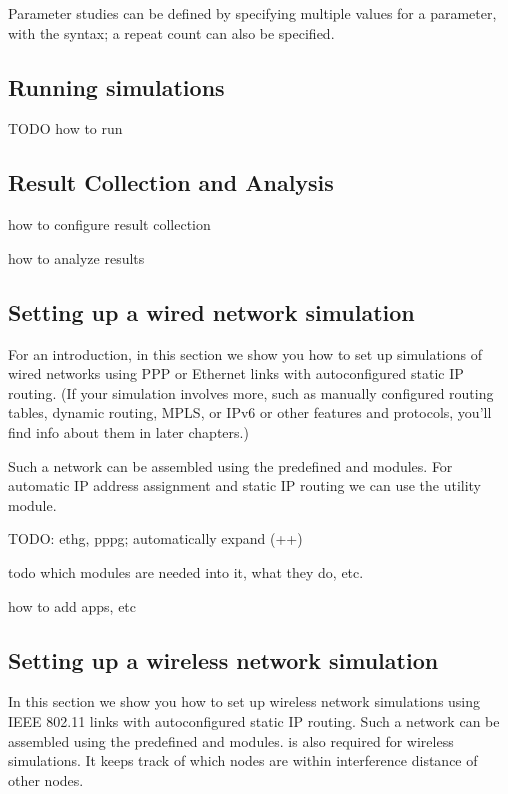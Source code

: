 Parameter studies can be defined by specifying multiple values for a
parameter, with the  syntax;
a repeat count can also be specified.


\subsection{Running simulations}

TODO how to run

\subsection{Result Collection and Analysis}

how to configure result collection

how to analyze results



\subsection{Setting up a wired network simulation}

For an introduction, in this section we show you how to set up simulations
of wired networks using PPP or Ethernet links with autoconfigured static IP
routing. (If your simulation involves more, such as manually configured
routing tables, dynamic routing, MPLS, or IPv6 or other features and protocols,
you'll find info about them in later chapters.)

Such a network can be assembled using the predefined 
and  modules. For automatic IP address assignment and
static IP routing we can use the  utility
module.

TODO:  ethg, pppg;  automatically expand (++)

todo which modules are needed into it, what they do, etc.

how to add apps, etc


\subsection{Setting up a wireless network simulation}

In this section we show you how to set up wireless network simulations using
IEEE 802.11 links with autoconfigured static IP routing. Such a network can be
assembled using the predefined  and 
modules.  is also required for wireless simulations. It
keeps track of which nodes are within interference distance of other nodes.


